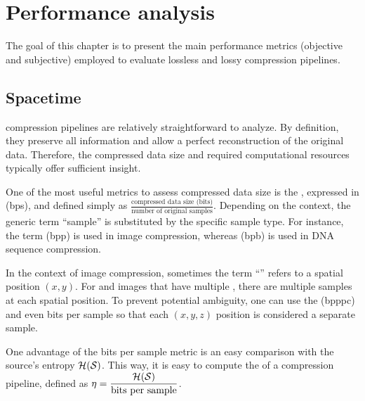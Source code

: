 \chapter{Performance analysis}\label{sec:rate_distortion}

The goal of this chapter is to present the main performance metrics
(objective and subjective) employed to evaluate lossless and lossy compression pipelines.

\section{Spacetime}\label{sec:rate_distortion:rate}

 compression pipelines are relatively straightforward to analyze.
By definition, they preserve all information and allow a perfect reconstruction of the original data. Therefore, the compressed data size and required computational resources typically offer sufficient insight.

One of the most useful metrics to assess compressed data size is the ,
expressed in  (bps), and defined simply as
$\displaystyle \frac{\textrm{compressed data size (bits)}}{\textrm{number of original samples}}$.
Depending on the context, the generic term ``sample'' is substituted by the specific sample type.
For instance, the term  (bpp) is used in image compression,
whereas  (bpb) is used in DNA sequence compression.

\begin{remark}
In the context of image compression, sometimes the term ``'' refers to a spatial position $(x,y)$. For  and  images that have multiple , there are multiple samples at each spatial position.
%
To prevent potential ambiguity, one can use the  (bpppc)
and even bits per sample so that each $(x,y,z)$ position is considered a separate sample.
\end{remark}

One advantage of the bits per sample metric is an easy comparison with the source's entropy $\mathcal{H}(\mathcal{S})$.
This way, it is easy to compute the  of a compression pipeline,
defined as $\displaystyle \eta = \frac{\mathcal{H}(\mathcal{S})}{\textrm{bits per sample}}$.

